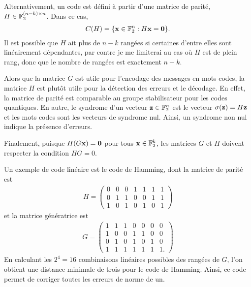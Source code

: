 Alternativement,
un code est défini à partir d'une matrice de parité, $H \in \mathbb{F}_{2}^{(n - k) \times n}$.
Dans ce cas,
\begin{align}
	C(H) = \qty{
		\vb x \in \mathbb{F}_{2}^n : H \vb x = \vb 0
	}.
\end{align}
Il est possible que $H$ ait plus de $n - k$ rangées si certaines d'entre elles 
sont linéairement dépendantes, par contre je me limiterai au cas où $H$ est 
de plein rang, donc que le nombre de rangées est exactement $n - k$.

Alors que la matrice $G$ est utile pour l'encodage des messages en mots codes,
la matrice $H$ est plutôt utile pour la détection des erreurs et le décodage.
En effet,
la matrice de parité est comparable au groupe stabilisateur pour les codes quantiques.
En autre,
le syndrome d'un vecteur $\vb z \in \mathbb{F}_{2}^n$ est le vecteur $\sigma(\vb z) = H\vb z$
et les mots codes sont les vecteurs de syndrome nul.
Ainsi, un syndrome non nul indique la présence d'erreurs.

Finalement, puisque $H (G\vb x) = \vb 0$ pour tous $\vb x \in \mathbb{F}_{2}^k$,
les matrices $G$ et $H$ doivent respecter la condition $HG = 0$.

Un exemple de code linéaire est le code de Hamming, dont la matrice
de parité est 
\begin{align}
	H = \begin{pmatrix}
		0 & 0 & 0 & 1 & 1 & 1 & 1 \\
		0 & 1 & 1 & 0 & 0 & 1 & 1 \\
		1 & 0 & 1 & 0 & 1 & 0 & 1
	\end{pmatrix}
\end{align}
et la matrice génératrice est 
\begin{align}
	G = \begin{pmatrix}
		1 & 1 & 1 & 0 & 0 & 0 & 0 \\
		1 & 0 & 0 & 1 & 1 & 0 & 0 \\
		0 & 1 & 0 & 1 & 0 & 1 & 0 \\
		1 & 1 & 1 & 1 & 1 & 1 & 1.
	\end{pmatrix}
\end{align}
En calculant les $2^4 = 16$ combinaisons linéaires possibles des 
rangées de $G$,
l'on obtient une distance minimale de trois pour le code de Hamming.
Ainsi,
ce code permet de corriger toutes les erreurs de norme de un.

